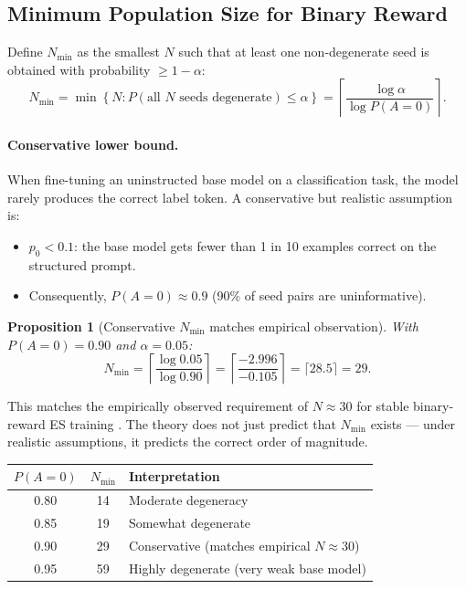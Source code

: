\documentclass[11pt]{article}
\newtheorem{proposition}[theorem]{Proposition}
\theoremstyle{definition}
\theoremstyle{remark}
\newcommand{\Nmin}{N_{\mathrm{min}}}
\begin{document}
\subsection{Minimum Population Size for Binary Reward}

Define $\Nmin$ as the smallest $N$ such that at least one non-degenerate seed is obtained with probability $\geq 1-\alpha$:
\begin{equation}
  \Nmin = \min\left\{N : P(\text{all } N \text{ seeds degenerate}) \leq \alpha\right\} = \left\lceil \frac{\log\alpha}{\log P(A=0)} \right\rceil.
  \label{eq:nmin}
\end{equation}

\paragraph{Conservative lower bound.}
When fine-tuning an uninstructed base model on a classification task, the model rarely produces the correct label token. A conservative but realistic assumption is:
\begin{itemize}[leftmargin=*]
  \item $p_0 < 0.1$: the base model gets fewer than 1 in 10 examples correct on the structured prompt.
  \item Consequently, $P(A=0) \approx 0.9$ (90\% of seed pairs are uninformative).
\end{itemize}

\begin{proposition}[Conservative $\Nmin$ matches empirical observation]
\label{prop:nmin-conservative}
With $P(A=0) = 0.90$ and $\alpha = 0.05$:
\begin{equation}
  \Nmin = \left\lceil \frac{\log 0.05}{\log 0.90} \right\rceil = \left\lceil \frac{-2.996}{-0.105} \right\rceil = \lceil 28.5 \rceil = \boxed{29}.
  \label{eq:nmin-29}
\end{equation}
\end{proposition}

This matches the empirically observed requirement of $N \approx 30$ for stable binary-reward ES training \citep{qiu2024esscale,liang2026blessing}. The theory does not just predict that $\Nmin$ exists --- under realistic assumptions, it predicts the correct order of magnitude.

\begin{center}
\begin{tabular}{ccl}
\toprule
$P(A=0)$ & $\Nmin$ & Interpretation\\
\midrule
0.80 & 14 & Moderate degeneracy\\
0.85 & 19 & Somewhat degenerate\\
0.90 & 29 & Conservative (matches empirical $N \approx 30$)\\
0.95 & 59 & Highly degenerate (very weak base model)\\
\bottomrule
\end{tabular}
\end{center}
\end{document}
